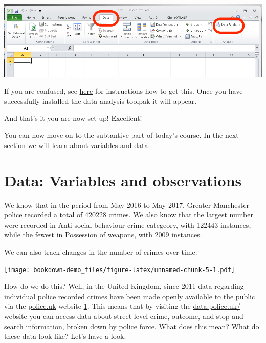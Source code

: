 \documentclass[]{book}
\theoremstyle{definition}
\theoremstyle{definition}
\theoremstyle{definition}
\theoremstyle{remark}
\begin{document}
\includegraphics{imgs/data_tab_analysis_appears.png}

If you are confused, see
\href{https://support.office.com/en-gb/article/Load-the-Analysis-ToolPak-6a63e598-cd6d-42e3-9317-6b40ba1a66b4}{here}
for instructions how to get this. Once you have successfully installed
the data analysis toolpak it will appear.

And that's it you are now set up! Excellent!

You can now move on to the subtantive part of today's course. In the
next section we will learn about variables and data.

\hypertarget{data-variables-and-observations}{%
\section{Data: Variables and
observations}\label{data-variables-and-observations}}

We know that in the period from May 2016 to May 2017, Greater Manchester
police recorded a total of 420228 crimes. We also know that the largest
number were recorded in Anti-social behaviour crime categeory, with
122443 instances, while the fewest in Possession of weapons, with 2009
instances.

We can also track changes in the number of crimes over time:

\texttt{[image: bookdown-demo\_files/figure-latex/unnamed-chunk-5-1.pdf]}

How do we do this? Well, in the United Kingdom, since 2011 data
regarding individual police recorded crimes have been made openly
available to the public via the \href{http://www.police.uk/}{police.uk}
website
\href{http://www.tandfonline.com/doi/abs/10.1080/15230406.2014.972456}{1}.
This means that by visiting the
\href{https://data.police.uk/}{data.police.uk/} website you can access
data about street-level crime, outcome, and stop and search information,
broken down by police force. What does this mean? What do these data
look like? Let's have a look:
\end{document}
